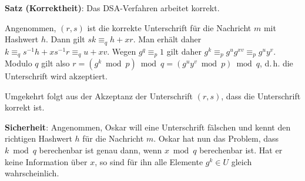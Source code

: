 \textbf{Satz (Korrektheit)}:
Das DSA-Verfahren arbeitet korrekt.

\begin{Beweis}
    Angenommen, $(r, s)$ ist die korrekte Unterschrift für die Nachricht $m$
    mit Hashwert $h$.
    Dann gilt $sk \equiv_q h + xr$.
    Man erhält daher $k \equiv_q s^{-1} h + xs^{-1} r \equiv_q u + xv$.
    Wegen $g^q \equiv_p 1$ gilt daher
    $g^k \equiv_p g^u g^{xv} \equiv_p g^u y^v$.
    Modulo $q$ gilt also $r = (g^k \bmod p) \bmod q = (g^u y^v \bmod p) \bmod q$,
    d.\,h. die Unterschrift wird akzeptiert.
    
    Umgekehrt folgt aus der Akzeptanz der Unterschrift $(r, s)$, dass
    die Unterschrift korrekt ist.
\end{Beweis}

\linie

\textbf{Sicherheit}:
Angenommen, Oskar will eine Unterschrift fälschen und kennt den richtigen Hashwert $h$ für
die Nachricht $m$.
Oskar hat nun das Problem, dass $k \bmod q$ berechenbar ist genau dann, wenn $x \bmod q$
berechenbar ist.
Hat er keine Information über $x$, so sind für ihn alle Elemente $g^k \in U$ gleich
wahrscheinlich.

\pagebreak
{}

